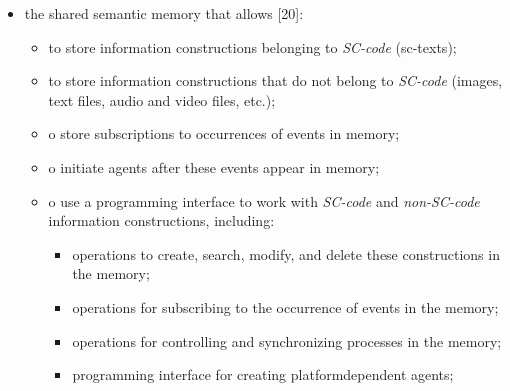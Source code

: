 \documentclass{article}
\begin{document}
\begin{multicols}{2}
\begin{itemize}
\end{itemize}
\begin{itemize}
\item the shared semantic memory that allows [20]:
\begin{itemize}
\item to store information constructions belonging to \textit{SC-code} (sc-texts);
\item to store information constructions that do not
belong to \textit{SC-code} (images, text files, audio and video files, etc.);
\item o store subscriptions to occurrences of events in
memory;
\item o initiate agents after these events appear in
memory;
\item o use a programming interface to work with \textit{SC-code} and \textit{non-SC-code} information constructions,
including:
\begin{itemize}
\item operations to create, search, modify, and
delete these constructions in the memory;
\item  operations for subscribing to the occurrence
of events in the memory;
\item operations for controlling and synchronizing
processes in the memory;
\item programming interface for creating platformdependent agents;



\end{itemize}
\end{itemize}


\end{itemize}
\end{multicols}
\end{document}
